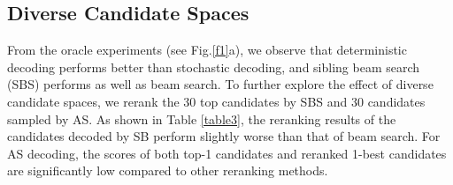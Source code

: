 \documentclass{article}
\begin{document}
\begin{table}[!ht]
\centering
{}
\caption{The reranking results from 30 candidates decoded by beam search, SBS, and AS on the test sets of IWSLT’14 De$\to$En.}
\label{table3}
\end{table}


\subsection{Diverse Candidate Spaces} \label{sec:decode}
From the oracle experiments (see Fig.\ref{f1}a), we observe that deterministic decoding performs better than stochastic decoding, and sibling beam search (SBS) performs as well as beam search. To further explore the effect of diverse candidate spaces, we rerank the 30 top candidates by SBS and 30 candidates sampled by AS. As shown in Table \ref{table3}, the reranking results of the candidates decoded by SB perform slightly worse than that of beam search. For AS decoding, the scores of both top-1 candidates and reranked 1-best candidates are significantly low compared to other reranking methods. %
\end{document}

